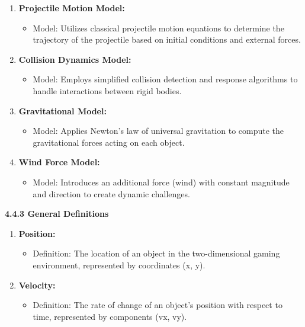 \documentclass[
]{article}
\begin{document}
\begin{enumerate}
\def\labelenumi{\arabic{enumi}.}
\item
  \textbf{Projectile Motion Model:}

  \begin{itemize}
  \item
    Model: Utilizes classical projectile motion equations to determine
    the trajectory of the projectile based on initial conditions and
    external forces.
  \end{itemize}
\item
  \textbf{Collision Dynamics Model:}

  \begin{itemize}
  \item
    Model: Employs simplified collision detection and response
    algorithms to handle interactions between rigid bodies.
  \end{itemize}
\item
  \textbf{Gravitational Model:}

  \begin{itemize}
  \item
    Model: Applies Newton's law of universal gravitation to compute the
    gravitational forces acting on each object.
  \end{itemize}
\item
  \textbf{Wind Force Model:}

  \begin{itemize}
  \item
    Model: Introduces an additional force (wind) with constant magnitude
    and direction to create dynamic challenges.
  \end{itemize}
\end{enumerate}

\textbf{4.4.3 General Definitions}

\begin{enumerate}
\def\labelenumi{\arabic{enumi}.}
\item
  \textbf{Position:}

  \begin{itemize}
  \item
    Definition: The location of an object in the two-dimensional gaming
    environment, represented by coordinates (x, y).
  \end{itemize}
\item
  \textbf{Velocity:}

  \begin{itemize}
  \item
    Definition: The rate of change of an object's position with respect
    to time, represented by components (vx, vy).
  \end{itemize}
\end{enumerate}
\end{document}
